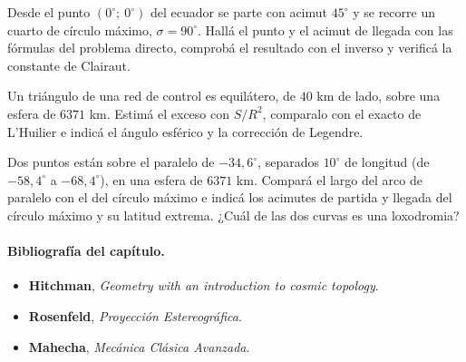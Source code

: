 \begin{ejercicio}\label{ex:esfera-directo}
Desde el punto \((0^\circ;\ 0^\circ)\) del ecuador se parte con acimut \(45^\circ\) y se recorre
un cuarto de círculo máximo, \(\sigma=90^\circ\). Hallá el punto y el acimut de llegada con
las fórmulas del problema directo, comprobá el resultado con el inverso y verificá la
constante de Clairaut.
\end{ejercicio}

\begin{ejercicio}\label{ex:esfera-legendre}
Un triángulo de una red de control es equilátero, de \(40\) km de lado, sobre una esfera de
\(6371\) km. Estimá el exceso con \(S/R^2\), comparalo con el exacto de L'Huilier e indicá el
ángulo esférico y la corrección de Legendre.
\end{ejercicio}

\begin{ejercicio}\label{ex:esfera-paralelo}
Dos puntos están sobre el paralelo de \(-34{,}6^\circ\), separados \(10^\circ\) de longitud
(de \(-58{,}4^\circ\) a \(-68{,}4^\circ\)), en una esfera de \(6371\) km. Compará el largo del
arco de paralelo con el del círculo máximo e indicá los acimutes de partida y llegada del círculo
máximo y su latitud extrema. ¿Cuál de las dos curvas es una loxodromia?
\end{ejercicio}

\paragraph{Bibliografía del capítulo.}

\begin{itemize}
  \item \textbf{Hitchman}, \emph{Geometry with an introduction to cosmic topology}.
  \item \textbf{Rosenfeld}, \emph{Proyección Estereográfica}.
  \item \textbf{Mahecha}, \emph{Mecánica Clásica Avanzada}.
\end{itemize}
